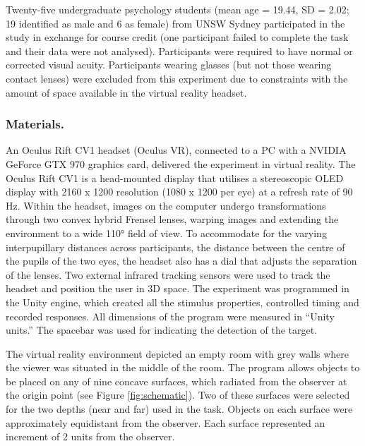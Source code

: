 \documentclass[
  english,
  man,floatsintext]{apa7}
\begin{document}
Twenty-five undergraduate psychology students (mean age = 19.44, SD = 2.02; 19 identified as male and 6 as female) from UNSW Sydney participated in the study in exchange for course credit (one participant failed to complete the task and their data were not analysed). Participants were required to have normal or corrected visual acuity. Participants wearing glasses (but not those wearing contact lenses) were excluded from this experiment due to constraints with the amount of space available in the virtual reality headset.

\hypertarget{materials.}{%
\subsubsection{Materials.}\label{materials.}}

An Oculus Rift CV1 headset (Oculus VR), connected to a PC with a NVIDIA GeForce GTX 970 graphics card, delivered the experiment in virtual reality. The Oculus Rift CV1 is a head-mounted display that utilises a stereoscopic OLED display with 2160 x 1200 resolution (1080 x 1200 per eye) at a refresh rate of 90 Hz. Within the headset, images on the computer undergo transformations through two convex hybrid Frensel lenses, warping images and extending the environment to a wide 110° field of view. To accommodate for the varying interpupillary distances across participants, the distance between the centre of the pupils of the two eyes, the headset also has a dial that adjusts the separation of the lenses. Two external infrared tracking sensors were used to track the headset and position the user in 3D space. The experiment was programmed in the Unity engine, which created all the stimulus properties, controlled timing and recorded responses. All dimensions of the program were measured in ``Unity units.'' The spacebar was used for indicating the detection of the target.

The virtual reality environment depicted an empty room with grey walls where the viewer was situated in the middle of the room. The program allows objects to be placed on any of nine concave surfaces, which radiated from the observer at the origin point (see Figure \ref{fig:schematic}). Two of these surfaces were selected for the two depths (near and far) used in the task. Objects on each surface were approximately equidistant from the observer. Each surface represented an increment of 2 units from the observer.
\end{document}
